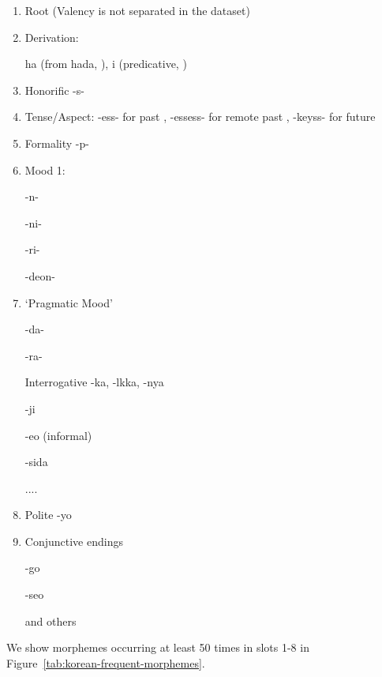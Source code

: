 \documentclass[11pt,letterpaper]{article}
\begin{document}
\begin{enumerate}
    \item Root (Valency is not separated in the dataset)
    \item Derivation:
    
    ha (from hada, \citep[4.1.2]{yeon2010korean}), i (predicative, \citep[4.1.4]{yeon2010korean})
    
    \item Honorific -s- \citep[4.3.2, 4.4.1]{yeon2010korean}
    \item Tense/Aspect: -ess- for past \citep[4.5.1.1]{yeon2010korean}, -essess- for remote past \citep[4.5.1.2]{yeon2010korean}, -keyss- for future \citep[4.5.2.1]{yeon2010korean}
    \item Formality -p- \citep[4.3.2]{yeon2010korean}
    \item Mood 1:
    
    -n-
    
    -ni- \citep[4.3.2]{yeon2010korean}
    
    -ri-
    
    -deon-
    
    \item `Pragmatic Mood'
    
    -da- \citep[4.3.2]{yeon2010korean}
    
    -ra- 
    
    Interrogative -ka, -lkka, -nya
    
    -ji \citep[4.2.2-3]{yeon2010korean}
    
    -eo (informal)
    
    -sida \citep[4.3.2]{yeon2010korean}
    
    ....
    
    \item Polite -yo
    \item Conjunctive endings
    
    -go
    
    -seo
    
    and others
    
\end{enumerate}


We show morphemes occurring at least 50 times in slots 1-8 in Figure~\ref{tab:korean-frequent-morphemes}.
\end{document}
